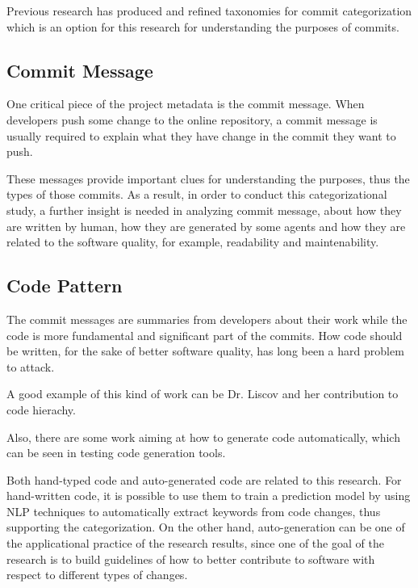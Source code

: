 Previous research has produced and refined taxonomies for commit categorization \cite{Hindle_cate,alali_2008,Dragan,Swanson, Mauczka, Hindle_auto,qrs2020} which is an option for this research for understanding the purposes of commits.



\subsection{Commit Message}
One critical piece of the project metadata is the commit message. 
When developers push some change to the online repository, a commit message is usually required to explain what they have change in the commit they want to push.

These messages provide important clues for understanding the purposes, thus the types of those commits. 
As a result, in order to conduct this categorizational study, a further insight is needed in analyzing commit message, about how they are written by human, how they are generated by some agents and how they are related to the software quality, for example, readability and maintenability.


\subsection{Code Pattern}
The commit messages are summaries from developers about their work while the code is more fundamental and significant part of the commits. 
How code should be written, for the sake of better software quality, has long been a hard problem to attack.

A good example of this kind of work can be Dr. Liscov and her contribution to code hierachy.

Also, there are some work aiming at how to generate code automatically, which can be seen in testing code generation tools.

Both hand-typed code and auto-generated code are related to this research.
For hand-written code, it is possible to use them to train a prediction model by using NLP techniques to automatically extract keywords from code changes, thus supporting the categorization.
On the other hand, auto-generation can be one of the applicational practice of the research results, since one of the goal of the research is to build guidelines of how to better contribute to software with respect to different types of changes.


